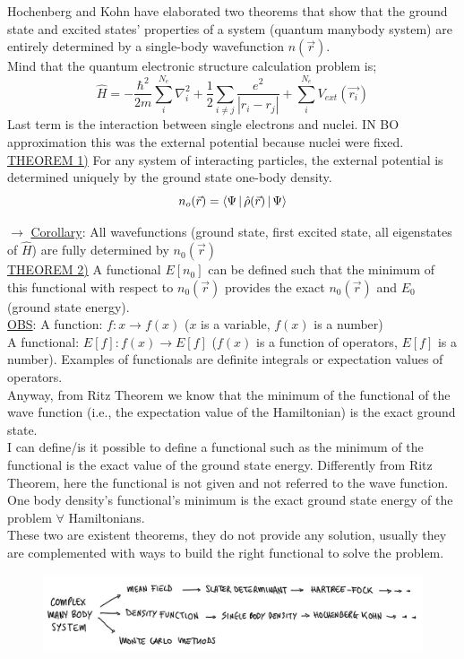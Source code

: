 Hochenberg and Kohn have elaborated two theorems that show that the ground state and excited states' properties of a system (quantum manybody system) are entirely determined by a single-body wavefunction $n(\vec{r})$.\\
Mind that the quantum electronic structure calculation problem is;
\[
\hat{H}=-\frac{\hbar^2}{2m}\sum_i^{N_e}\nabla_i^2+\frac{1}{2}\sum_{i\neq j} \frac{e^2}{|r_i-r_j|}+\sum_i^{N_e}V_{ext}(\vec{r_i})
\]
Last term is the interaction between single electrons and nuclei. IN BO approximation this was the external potential because nuclei were fixed.\\

\ul{THEOREM 1)} For any system of interacting particles, the external potential is determined uniquely by the ground state one-body density.
\[n_o(\vec{r})=\braket{\Psi\,|\,\hat{\rho}(\vec{r})\,|\,\Psi}\]

$\rightarrow\,\,$\ul{Corollary}: All wavefunctions (ground state, first excited state, all eigenstates of $\hat{H}$) are fully determined by $n_0(\vec{r})$\\

\ul{THEOREM 2)} A functional $E[n_0]$ can be defined such that the minimum of this functional with respect to $n_0(\vec{r})$ provides the exact $n_0(\vec{r})$ and $E_0$ (ground state energy).\\

\ul{OBS}: A function: $f: x \rightarrow f(x)$ ($x$ is a variable, $f(x)$ is a number)\\
A functional: $E[f]: f(x) \rightarrow E[f]$ ($f(x)$ is a function of operators, $E[f]$ is a number). Examples of functionals are definite integrals or expectation values of operators.\\
Anyway, from Ritz Theorem we know that the minimum of the functional of the wave function (i.e., the expectation value of the Hamiltonian) is the exact ground state.\\

I can define/is it possible to define a functional such as the minimum of the functional is the exact value of the ground state energy. Differently from Ritz Theorem, here the functional is not given and not referred to the wave function. One body density's functional's minimum is the exact ground state energy of the problem $\forall$ Hamiltonians.\\

These two are existent theorems, they do not provide any solution, usually they are complemented with ways to build the right functional to solve the problem.\\
\begin{figure}[htbp!]
	\centering
	\includegraphics[scale=0.30]{img_15}
\end{figure}

